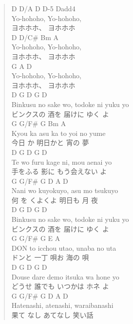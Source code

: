 \documentclass[11pt]{article}
\begin{document}
\begin{verse}
D       D/A     D      D-5   Dadd4\\
Yo-hohoho, Yo-hohoho,\\
ヨホホホ、    ヨホホホ\\
D       D/C\#    Bm     A\\
Yo-hohoho, Yo-hohoho,\\
ヨホホホ、    ヨホホホ\\
G       A       D\\
Yo-hohoho, Yo-hohoho,\\
ヨホホホ、    ヨホホホ\\
\vspace*{1em}
D          G        D         G    D\\
Binkusu no sake wo, todoke ni yuku yo\\
ビンクスの   酒を     届けに     ゆく  よ\\
G    G/F\# G         Bm       A\\
Kyou ka   asu ka to yoi no yume\\
今日  か   明日かと   宵の      夢\\
D          G        D      G   D\\
Te wo furu kage ni, mou  aenai yo\\
手をふる    影に      もう会えない よ\\
G    G/F\# G        D     A    D\\
Nani wo kuyokuyo, asu mo tsukuyo\\
何   を  くよくよ   明日も  月   夜\\
\vspace*{1em}
D          G        D         G    D\\
Binkusu no sake wo, todoke ni yuku yo\\
ビンクスの   酒を     届けに     ゆく  よ\\
G      G/F\#   G       E       A\\
DON to icchou utao, unaba no uta\\
ドンと  一丁    唄お   海の      唄\\
D       G       D         G    D\\
Douse dare demo itsuka wa hone yo\\
どうせ  誰でも    いつかは   ホネ  よ\\
\hspace*{2em}G   G/F\#  G          D  A   D\\
Hatenashi, atenashi, waraibanashi\\
果て なし   あてなし     笑い話\\

\end{verse}
\end{document}
